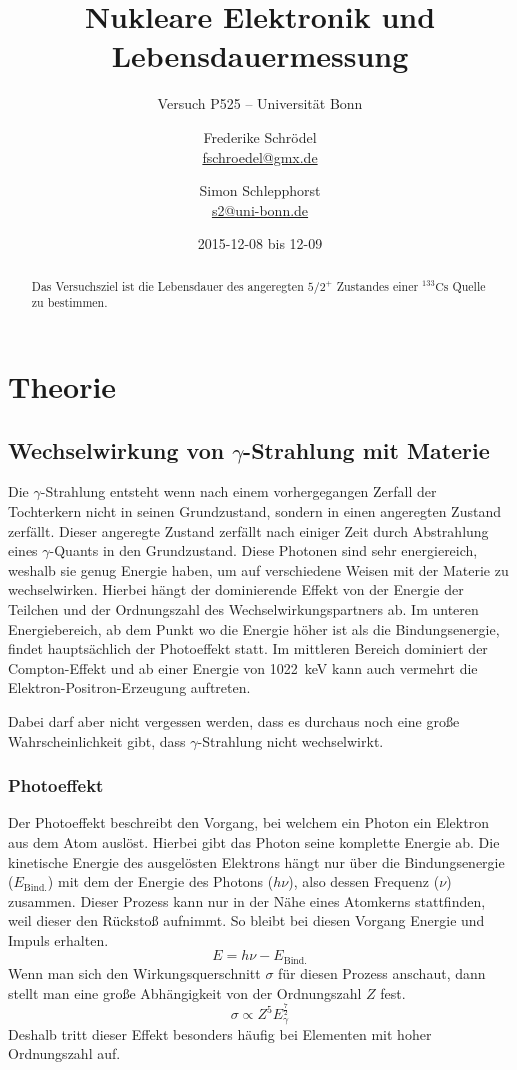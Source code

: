 \documentclass[11pt, ngerman, fleqn, DIV=15, headinclude, BCOR=2cm]{scrreprt}
\title{Nukleare Elektronik und Lebensdauermessung}
\subtitle{Versuch P525 -- Universität Bonn}
\author{
	Frederike Schrödel \\
	\small{\href{mailto:fschroedel@gmx.de}{fschroedel@gmx.de}}
	\and
	Simon Schlepphorst \\
	\small{\href{mailto:s2@uni-bonn.de}{s2@uni-bonn.de}}
}
\date{2015-12-08 bis 12-09}
\begin{document}
\maketitle

\begin{abstract}
	Das Versuchsziel ist die Lebensdauer des angeregten $5/2^+$
        Zustandes einer $^{133}\text{Cs}$ Quelle zu bestimmen.
\end{abstract}


\tableofcontents

\chapter{Theorie}

\section{Wechselwirkung von $\gamma$-Strahlung mit Materie}
\label{sec:WW-strahlung-Materie}

Die $\gamma$-Strahlung entsteht wenn nach einem vorhergegangen Zerfall der
Tochterkern nicht in seinen Grundzustand, sondern in einen angeregten Zustand
zerfällt.
Dieser angeregte Zustand zerfällt nach einiger Zeit durch Abstrahlung eines
$\gamma$-Quants in den Grundzustand. Diese Photonen sind sehr energiereich,
weshalb sie genug Energie haben, um auf verschiedene Weisen mit der Materie zu
wechselwirken. Hierbei hängt der dominierende Effekt von der
Energie der Teilchen und der Ordnungszahl des Wechselwirkungspartners ab.
Im unteren Energiebereich, ab dem Punkt wo die Energie höher ist als die
Bindungsenergie, findet hauptsächlich der Photoeffekt statt. Im mittleren
Bereich dominiert der Compton-Effekt und ab einer Energie von
\SI{1022}{\kilo\electronvolt} kann auch vermehrt die
Elektron-Positron-Erzeugung auftreten.

Dabei darf aber nicht vergessen werden, dass es durchaus noch eine große
Wahrscheinlichkeit gibt, dass $\gamma$-Strahlung nicht wechselwirkt.


\subsection{Photoeffekt}
Der Photoeffekt beschreibt den Vorgang, bei welchem ein Photon ein Elektron aus
dem Atom auslöst.
Hierbei gibt das Photon seine komplette Energie ab.
Die kinetische Energie des ausgelösten Elektrons hängt nur über die
Bindungsenergie ($E_\text{Bind.}$) mit dem der Energie des Photons ($h\nu$),
also dessen Frequenz ($\nu$) zusammen.
Dieser Prozess kann nur in der Nähe eines Atomkerns stattfinden, weil dieser
den Rückstoß aufnimmt.
So bleibt bei diesen Vorgang Energie und Impuls erhalten. 
\[ 
    E = h\nu - E_\text{Bind.}
\]
Wenn man sich den Wirkungsquerschnitt $\sigma$ für diesen Prozess anschaut,
dann stellt man eine große Abhängigkeit von der Ordnungszahl $Z$ fest.
\[
    \sigma \propto Z^5 E_\gamma^{\frac 72}
\]
Deshalb tritt dieser Effekt besonders häufig bei Elementen mit hoher Ordnungszahl
auf.
\end{document}
